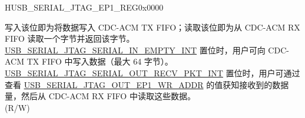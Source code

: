 \begin{register}{H}{USB\_SERIAL\_JTAG\_EP1\_REG}{0x0000}\label{regdesc:USBSERIALJTAGEP1REG}
%
%
\regnewline%
\begin{regdesc}\begin{reglist}
\label{fielddesc:USBSERIALJTAGRDWRBYTE}\item [USB\_SERIAL\_JTAG\_RDWR\_BYTE] 写入该位即为将数据写入 CDC-ACM TX FIFO；读取该位即为从 CDC-ACM RX FIFO 读取一个字节并返回该字节。\\
\hyperref[int:USBSERIALJTAGSERIALINEMPTYINT]{USB\_SERIAL\_JTAG\_SERIAL\_IN\_EMPTY\_INT} 置位时，用户可向 CDC-ACM TX FIFO 中写入数据（最大 64 字节）。\\
\hyperref[int:USBSERIALJTAGSERIALOUTRECVPKTINT]{USB\_SERIAL\_JTAG\_SERIAL\_OUT\_RECV\_PKT\_INT} 置位时，用户可通过查看 \hyperref[fielddesc:USBSERIALJTAGOUTEP1WRADDR]{USB\_SERIAL\_JTAG\_OUT\_EP1\_WR\_ADDR} 的值获知接收到的数据量，然后从 CDC-ACM RX FIFO 中读取这些数据。\\
(R/W)
\end{reglist}\end{regdesc}
\end{register}



